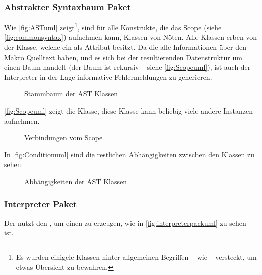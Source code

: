     \subsubsection{Abstrakter Syntaxbaum Paket}
    \label{sssec:Abstrakter Syntaxbaum Paket}
      Wie \autoref{fig:ASTuml} zeigt\footnote{
        Es wurden einigele Klassen hinter allgemeinen Begriffen -- wie  -- versteckt, um etwas Übersicht zu bewahren.
      }, sind für alle Konstrukte, die das Scope (siehe \autoref{fig:commonsyntax}) aufnehmen kann, Klassen von Nöten. Alle Klassen erben von der  Klasse, welche ein  als Attribut besitzt. Da die  alle Informationen über den Makro Quelltext haben, und es sich bei der resultierenden Datenstruktur um einen Baum handelt (der Baum ist rekursiv -- siehe \autoref{fig:Scopeuml}), ist auch der Interpreter in der Lage informative Fehlermeldungen zu generieren.
      \begin{figure}[H]
        \centering
        \caption{Stammbaum der AST Klassen}
        \label{fig:ASTuml}
      \end{figure}

      \autoref{fig:Scopeuml} zeigt die  Klasse, diese Klasse kann beliebig viele andere  Instanzen aufnehmen.
      \begin{figure}[H]
        \centering
        \caption{Verbindungen vom Scope}
        \label{fig:Scopeuml}
      \end{figure}

      In \autoref{fig:Conditionuml} sind die restlichen Abhängigkeiten zwischen den  Klassen zu sehen.
      \begin{figure}[H]
        \centering
        \caption{Abhängigkeiten der AST Klassen}
        \label{fig:Conditionuml}
      \end{figure}

    \subsubsection{Interpreter Paket}
    \label{sssec:Interpreter Paket}
      Der  nutzt den , um einen  zu erzeugen, wie in \autoref{fig:interpreterpackuml} zu sehen ist.

